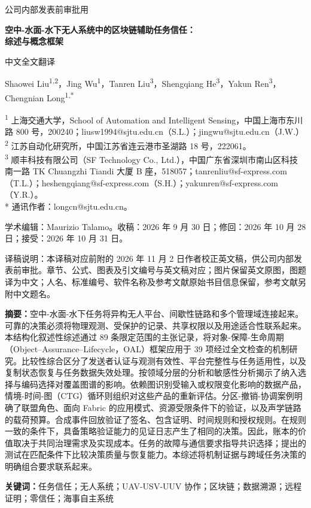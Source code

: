 \begin{center}
{\small 公司内部发表前审批用}\par\vspace{7pt}
{\LARGE\bfseries 空中-水面-水下无人系统中的区块链辅助任务信任：\\[3pt]综述与概念框架}\par\vspace{8pt}
{\large 中文全文翻译}\par\vspace{9pt}
Shaowei Liu\textsuperscript{1,2}，Jing Wu\textsuperscript{1}，Tanren Liu\textsuperscript{3}，Shengqiang He\textsuperscript{3}，Yakun Ren\textsuperscript{3}，Chengnian Long\textsuperscript{1,*}
\end{center}
\begingroup\small\noindent
\textsuperscript{1} 上海交通大学，School of Automation and Intelligent Sensing，中国上海市东川路 800 号，200240；liusw1994@sjtu.edu.cn（S.L.）；jingwu@sjtu.edu.cn（J.W.）\\
\textsuperscript{2} 江苏自动化研究所，中国江苏省连云港市圣湖路 18 号，222061。\\
\textsuperscript{3} 顺丰科技有限公司（SF Technology Co., Ltd.），中国广东省深圳市南山区科技南一路 TK Chuangzhi Tiandi 大厦 B 座，518057；tanrenliu@sf-express.com（T.L.）；heshengqiang@sf-express.com（S.H.）；yakunren@sf-express.com（Y.R.）。\\
* 通讯作者：longcn@sjtu.edu.cn。\par
\medskip\noindent 学术编辑：Maurizio Talamo。收稿：2026 年 9 月 30 日；修回：2026 年 10 月 28 日；接受：2026 年 10 月 31 日。\par
\medskip\noindent 译稿说明：本译稿对应前附的 2026 年 11 月 2 日作者校正英文稿，供公司内部发表前审批。章节、公式、图表及引文编号与英文稿对应；图片保留英文原图，图题译为中文；人名、标准编号、软件名称及参考文献原始书目信息保留，参考文献另附中文题名。\par\endgroup
\vspace{8pt}
\noindent\textbf{摘要：}空中-水面-水下任务将异构无人平台、间歇性链路和多个管理域连接起来。可靠的决策必须将物理观测、受保护的记录、共享权限以及用途适合性联系起来。本结构化叙述性综述通过 89 条限定范围的主张记录，将对象-保障-生命周期（Object--Assurance--Lifecycle，OAL）框架应用于 39 项经过全文检查的机制研究。比较性综合区分了发送者认证与观测有效性、平台完整性与任务适用性，以及复制状态恢复与任务数据失效处理。按领域分层的分析和敏感性分析揭示了纳入选择与编码选择对覆盖图谱的影响。依赖图识别受输入或权限变化影响的数据产品，情境-时间-图（CTG）循环则组织对这些产品的重新评估。分区-撤销-协调案例明确了联盟角色、面向 Fabric 的应用模式、资源受限条件下的验证，以及声学链路的载荷预算。合成事件回放验证了签名、包含证明、时间规则和授权规则。在规则一致的条件下，具备策略验证能力的见证日志产生了相同的决策。因此，账本的价值取决于共同治理需求及实现成本。任务的故障与通信要求指导共识选择；提出的测试在匹配条件下比较决策质量与恢复能力。本综述将机制证据与跨域任务决策的明确组合要求联系起来。

\noindent\textbf{关键词：}任务信任；无人系统；UAV-USV-UUV 协作；区块链；数据溯源；远程证明；零信任；海事自主系统
